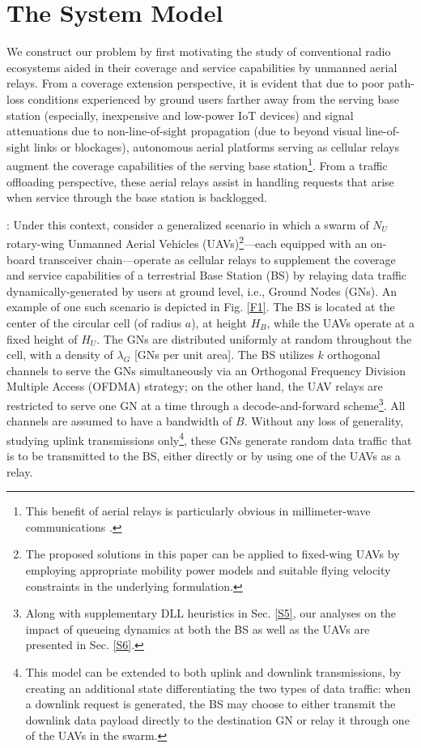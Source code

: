 \documentclass[12pt, draftcls, onecolumn]{IEEEtran}
\theoremstyle{plain}
\theoremstyle{definition}
\theoremstyle{remark}
\begin{document}
\section{The System Model}\label{S2}
\vspace{-2mm}

We construct our problem by first motivating the study of conventional radio ecosystems aided in their coverage and service capabilities by unmanned aerial relays. From a coverage extension perspective, it is evident that due to poor path-loss conditions experienced by ground users farther away from the serving base station (especially, inexpensive and low-power IoT devices) and signal attenuations due to non-line-of-sight propagation (due to beyond visual line-of-sight links or blockages), autonomous aerial platforms serving as cellular relays augment the coverage capabilities of the serving base station\footnote{This benefit of aerial relays is particularly obvious in millimeter-wave communications \cite{NRSM}.}. From a traffic offloading perspective, these aerial relays assist in handling requests that arise when service through the base station is backlogged. 

: Under this context, consider a generalized scenario in which a swarm of $N_{U}$ rotary-wing Unmanned Aerial Vehicles (UAVs)\footnote{The proposed solutions in this paper can be applied to fixed-wing UAVs \cite{FixedWingUAVs} by employing appropriate mobility power models and suitable flying velocity constraints in the underlying formulation.}---each equipped with an on-board transceiver chain---operate as cellular relays to supplement the coverage and service capabilities of a terrestrial Base Station (BS) by relaying data traffic dynamically-generated by users at ground level, i.e., Ground Nodes (GNs). An example of one such scenario is depicted in Fig. \ref{F1}. The BS is located at the center of the circular cell (of radius $a$), at height $H_{B}$, while the UAVs operate at a fixed height of $H_{U}$. The GNs are distributed uniformly at random throughout the cell, with a density of $\lambda_{G}$ [GNs per unit area]. The BS utilizes $k$ orthogonal channels to serve the GNs simultaneously via an Orthogonal Frequency Division Multiple Access (OFDMA) strategy; on the other hand, the UAV relays are restricted to serve one GN at a time through a decode-and-forward scheme\footnote{Along with supplementary DLL heuristics in Sec. \ref{S5}, our analyses on the impact of queueing dynamics at both the BS as well as the UAVs are presented in Sec. \ref{S6}.}. All channels are assumed to have a bandwidth of $B$. Without any loss of generality, studying uplink transmissions only\footnote{This model can be extended to both uplink and downlink transmissions, by creating an additional state differentiating the two types of data traffic: when a downlink request is generated, the BS may choose to either transmit the downlink data payload directly to the destination GN or relay it through one of the UAVs in the swarm.}, these GNs generate random data traffic that is to be transmitted to the BS, either directly or by using one of the UAVs as a relay.
\end{document}
